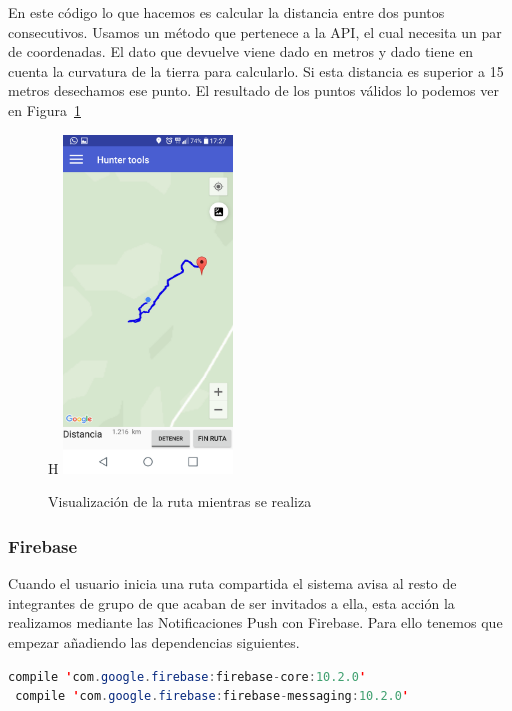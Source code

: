 En este código lo que hacemos es calcular la distancia entre dos puntos consecutivos. Usamos un método que pertenece a la API,  el cual necesita un par de coordenadas. El dato que devuelve viene dado en metros y  dado tiene en cuenta la curvatura de la tierra para calcularlo. Si esta distancia es superior a 15 metros desechamos ese punto. El resultado de los puntos válidos lo podemos ver en  Figura~\ref{fig:individual-navegacion2}

\begin{figure}{H}
		\centering
		\includegraphics[width=0.4\textwidth] {capturamovil/individual-navegacion.png}
		\caption{Visualización de la ruta mientras se realiza}
		\label{fig:individual-navegacion2}
	\end{figure}
	
\subsubsection{Firebase} 
Cuando el usuario inicia una ruta compartida el sistema avisa al resto de integrantes de grupo de que acaban de ser invitados a ella, esta acción la realizamos mediante las Notificaciones Push con Firebase. Para ello tenemos que empezar añadiendo las dependencias siguientes.

	\begin{lstlisting}[language=java,caption={Dependencia de Firebase},label=DescriptiveLabel]
 compile 'com.google.firebase:firebase-core:10.2.0'
 compile 'com.google.firebase:firebase-messaging:10.2.0'

\end{lstlisting}
	
